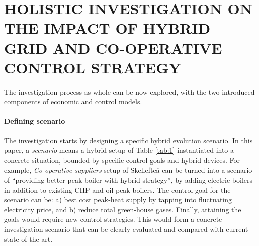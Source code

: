 \documentclass[a4paper,twoside]{article}
\begin{document}

\section{\uppercase{Holistic Investigation on the Impact of Hybrid Grid and
  Co-operative Control Strategy}}
\label{sec:hol} 

The investigation process as whole can be now explored, with the two
introduced components of economic and control models.


\paragraph{Defining scenario} 
The investigation starts by designing a specific hybrid evolution
scenario. In this paper, a {\em scenario} means a hybrid setup of Table
\ref{tab:1} instantiated into a concrete situation, bounded by
specific control goals and hybrid devices. For example, {\em 
  Co-operative suppliers} setup of Skellefte{\aa} can be turned into a 
scenario of ``providing better peak-boiler with hybrid strategy'', by
adding electric boilers in addition to existing CHP and oil peak
boilers. The control goal for the scenario can be: a) best cost
peak-heat supply by tapping into fluctuating electricity price, and b)
reduce total green-house gases. Finally, attaining the goals would
require new control strategies.  
This would form a concrete investigation scenario that can be clearly
evaluated and compared with current state-of-the-art.  
\end{document}

